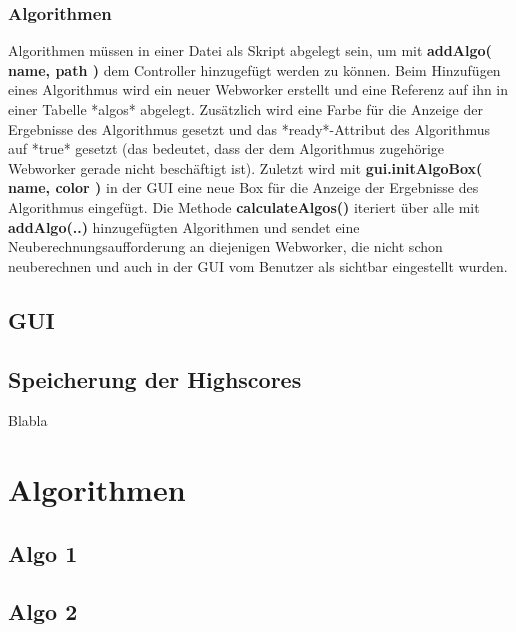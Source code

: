\documentclass[a4paper,twocolumn]{scrartcl}
\begin{document}
\subsubsection{Algorithmen}
Algorithmen müssen in einer Datei als Skript abgelegt sein, um mit \textbf{addAlgo( name, path )} dem Controller hinzugefügt werden zu können. Beim Hinzufügen eines Algorithmus wird ein neuer Webworker erstellt und eine Referenz auf ihn in einer Tabelle *algos* abgelegt. Zusätzlich wird eine Farbe für die Anzeige der Ergebnisse des Algorithmus gesetzt und das *ready*-Attribut des Algorithmus auf *true* gesetzt (das bedeutet, dass der dem Algorithmus zugehörige Webworker gerade nicht beschäftigt ist). Zuletzt wird mit \textbf{gui.initAlgoBox( name, color )} in der GUI eine neue Box für die Anzeige der Ergebnisse des Algorithmus eingefügt.
Die Methode \textbf{calculateAlgos()} iteriert über alle mit \textbf{addAlgo(..)} hinzugefügten Algorithmen und sendet eine Neuberechnungsaufforderung an diejenigen Webworker, die nicht schon neuberechnen und auch in der GUI vom Benutzer als sichtbar eingestellt wurden.

\subsection{GUI}

\subsection{Speicherung der Highscores}
Blabla

\section{Algorithmen}

\subsection{Algo 1}
\subsection{Algo 2}
\end{document}
